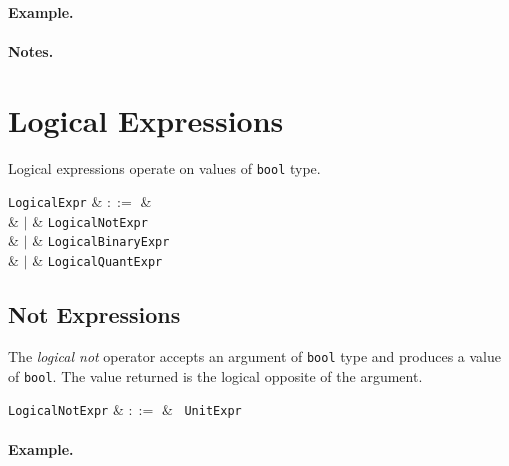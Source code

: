 \paragraph{Example.}

\paragraph{Notes.}


\section{Logical Expressions}
\label{c_expr_logical}

Logical expressions operate on values of \lstinline{bool} type.

\begin{syntax}
  \verb+LogicalExpr+ & $::=$ &\\
  & $|$ & \verb+LogicalNotExpr+\\
  & $|$ & \verb+LogicalBinaryExpr+\\
  & $|$ & \verb+LogicalQuantExpr+\\
\end{syntax}



\subsection{Not Expressions}
\label{c_expr_logical_not}

The {\em logical not} operator accepts an argument of \lstinline{bool} type and produces a value of \lstinline{bool}.  The value returned is the logical opposite of the argument.  

\begin{syntax}
\verb+LogicalNotExpr+ & $::=$ & \token{!}\ \verb+UnitExpr+\\
\end{syntax}

\paragraph{Example.}

